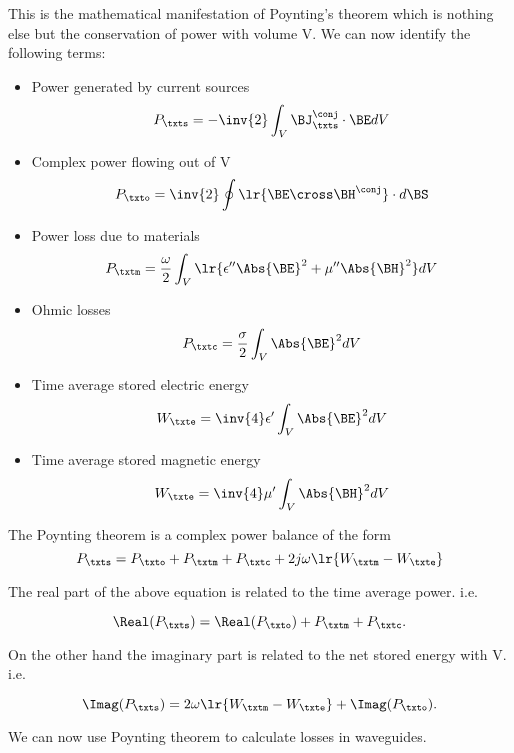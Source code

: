 This is the mathematical manifestation of Poynting's theorem which is nothing else but the conservation of power with volume V.  We can now identify the following terms:

\begin{itemize}
\item Power generated by current sources
\begin{equation}\label{eqn:uwavesLecture2:1320}
P_\txts = -\inv{2} \int_V \BJ_\txts^\conj \cdot \BE dV
\end{equation}
\item Complex power flowing out of V
\begin{equation}\label{eqn:uwavesLecture2:1340}
P_\txto = \inv{2} \oint \lr{ \BE \cross \BH^\conj } \cdot d\BS
\end{equation}
\item Power loss due to materials
\begin{equation}\label{eqn:uwavesLecture2:1360}
P_\txtm = \frac{\omega}{2} \int_V \lr{ \epsilon'' \Abs{\BE}^2 + \mu'' \Abs{\BH}^2 } dV
\end{equation}
\item Ohmic losses
\begin{equation}\label{eqn:uwavesLecture2:1380}
P_\txtc = \frac{\sigma}{2} \int_V \Abs{\BE}^2 dV
\end{equation}
\item Time average stored electric energy
\begin{equation}\label{eqn:uwavesLecture2:1400}
W_\txte = \inv{4} \epsilon' \int_V \Abs{\BE}^2 dV
\end{equation}
\item Time average stored magnetic energy
\begin{equation}\label{eqn:uwavesLecture2:1420}
W_\txte = \inv{4} \mu' \int_V \Abs{\BH}^2 dV
\end{equation}
\end{itemize}

The Poynting theorem is a complex power balance of the form
\begin{equation}\label{eqn:uwavesLecture2:1440}
P_\txts = P_\txto + P_\txtm + P_\txtc + 2 j \omega \lr{ W_\txtm - W_\txte }
\end{equation}

The real part of the above equation is related to the time average power.  i.e.

\begin{equation}\label{eqn:uwavesLecture2:1460}
\Real(P_\txts) = \Real(P_\txto) + P_\txtm + P_\txtc.
\end{equation}

On the other hand the imaginary part is related to the net stored energy with V.  i.e.

\begin{equation}\label{eqn:uwavesLecture2:1480}
\Imag( P_\txts ) = 2 \omega \lr{ W_\txtm - W_\txte } + \Imag( P_\txto ).
\end{equation}

We can now use Poynting theorem to calculate losses in waveguides.
